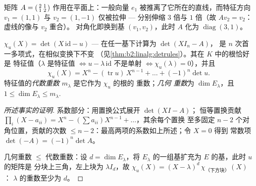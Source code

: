 \begin{omfigure}

{\small 矩阵 $A = \begin{psmallmatrix}2 & 1\\ 1 &
2\end{psmallmatrix}$ 作用在平面上：一般向量
$e_1$ 被推离了它所在的直线，而特征方向 $v_1 =
(1,1)$ 与 $v_2 = (1,-1)$ 仅被拉伸 --- 分别伸缩 $3$ 倍与
$1$ 倍（故 $Av_2 = v_2$：虚线的像与 $v_2$ 重合）。
对角化即换到基 $(v_1, v_2)$，此时
$A$ 化为 $\operatorname{diag}(3, 1)$。}
\end{omfigure}

\begin{definition}[特征多项式]\label{def:b2:reduction:charpoly}
$\chi_u(X) = \det(X\,\mathrm{id} - u)$ --- 在任一基下计算为 $\det(XI_n - A)$，
是 $n$ 次首一多项式，在相似变换下不变
（见\cref{thm:b2:linalg:detrules}）。其在 $K$ 中的根恰好是
特征值（$\lambda$ 是特征值 $\iff u - \lambda\,\mathrm{id}$
不是单射 $\iff \chi_u(\lambda) = 0$），并且
\[
\chi_u(X) = X^n - (\operatorname{tr} u)\, X^{n-1} + \dots +
(-1)^n \det u .
\]
特征值的\emph{代数重数}
$m_\lambda$ 是它作为 $\chi_u$ 的根的
重数；\emph{几何
重数}为 $\dim E_\lambda$，且 $1 \leq \dim E_\lambda \leq
m_\lambda$.
\end{definition}

\begin{proof}[所述事实的证明]
系数部分：用置换公式展开 $\det(XI - A)$；
恒等置换贡献 $\prod_i (X - a_{ii})
= X^n - (\sum a_{ii})X^{n-1} + \dots$，其余每个置换
至多固定 $n - 2$ 个对角位置，贡献的次数 $\leq
n - 2$：最高两项的系数如上所述；令 $X = 0$ 得到
常数项 $\det(-A) = (-1)^n\det A$。

几何重数 $\leq$ 代数重数：设 $d = \dim E_\lambda$，将
$E_\lambda$ 的一组基扩充为 $E$ 的基，此时 $u$ 的矩阵是
分块上三角，左上块为 $\lambda I_d$，故 $\chi_u(X) =
(X - \lambda)^d\, \chi_{\text{（下方块）}}(X)$：
$\lambda$ 的重数至少为 $d$。
\end{proof}

